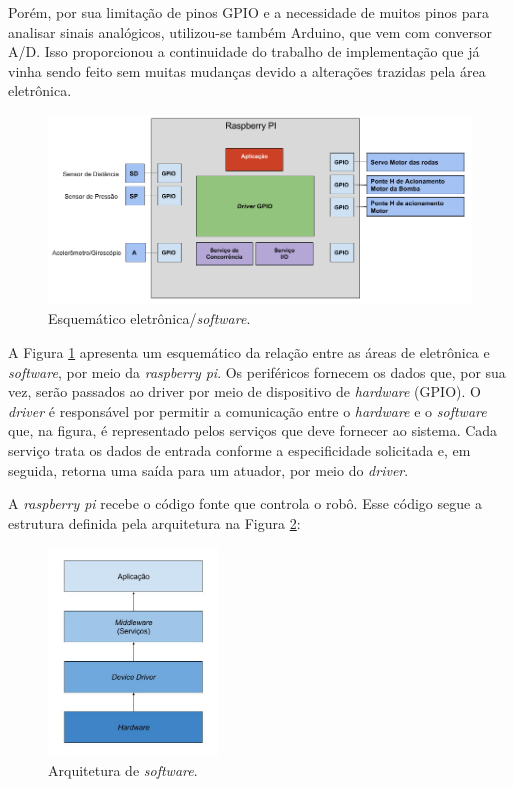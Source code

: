 Porém, por sua limitação de pinos GPIO e a necessidade de muitos pinos para analisar sinais analógicos, utilizou-se também Arduino, que vem com conversor A/D. Isso proporcionou a continuidade do trabalho de implementação que já vinha sendo feito sem muitas mudanças devido a alterações trazidas pela área eletrônica.

\begin{figure}[h]
  \centering
  \includegraphics[width=\textwidth]{figuras/schema-eletro-soft.png}
  \caption{Esquemático eletrônica/\textit{software}.}
  \label{fig:schema-eletro-soft}
\end{figure}
\FloatBarrier

A Figura \ref{fig:schema-eletro-soft} apresenta um esquemático da relação entre as áreas de eletrônica e \textit{software}, por meio da \textit{raspberry pi}. Os periféricos fornecem os dados que, por sua vez, serão passados ao driver por meio de dispositivo de \textit{hardware} (GPIO).  O \textit{driver} é responsável por permitir a comunicação entre o \textit{hardware} e o \textit{software} que, na figura, é representado pelos serviços que deve fornecer ao sistema. Cada serviço trata os dados de entrada conforme a especificidade solicitada e, em seguida, retorna uma saída para um atuador, por meio do \textit{driver}.

A \textit{raspberry pi} recebe o código fonte que controla o robô. Esse código segue a estrutura definida pela arquitetura na Figura \ref{fig:schema-arch}:

\begin{figure}[h]
  \centering
  \includegraphics[width=0.4\textwidth]{figuras/schema-arch.jpg}
  \caption{Arquitetura de \textit{software}.}
  \label{fig:schema-arch}
\end{figure}
\FloatBarrier

